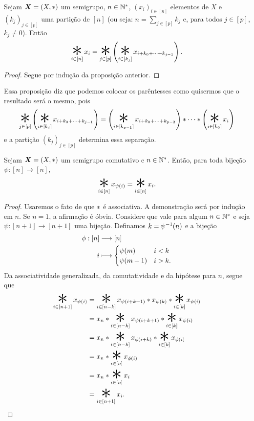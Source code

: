 \begin{prop}
Sejam $\bm X=(X,\ast)$ um semigrupo, $n \in \mathbb{N}^*$, $(x_i)_{i \in [n]}$ elementos de $X$ e $(k_j)_{j \in [p]}$ uma partição de $[n]$ (ou seja: $n = \sum_{j \in [p]} k_j$ e, para todos $j \in [p]$, $k_j \neq 0$). Então
	\begin{equation*}
	\bigopb_{i \in [n]} x_i = \bigopb_{j \in [p]}\left(\bigopb_{i \in [k_j]} x_{i + k_0 + \cdots + k_{j-1}}\right).
	\end{equation*}
\end{prop}
\begin{proof}
Segue por indução da proposição anterior.
\end{proof}

Essa proposição diz que podemos colocar os parêntesses como quisermos que o resultado será o mesmo, pois
	\begin{equation*}
	\bigopb_{j \in [p]}\left(\bigopb_{i \in [k_j]} x_{i + k_0 + \cdots + k_{j-1}}\right) = \left(\bigopb_{i \in [k_{p-1}]} x_{i + k_0 + \cdots + k_{p-2}}\right) \opb \cdots \opb \left(\bigopb_{i \in [k_0]} x_i\right)
	\end{equation*}
e a partição $(k_j)_{j \in [p]}$ determina essa separação.

\begin{prop}
Sejam $\bm X=(X, \ast )$ um semigrupo comutativo e $n \in \mathbb{N}^*$. Então, para toda bijeção $\psi\colon [n] \to [n]$,
	\begin{equation*}
	\bigopb_{i \in [n]} x_{\psi(i)} = \bigopb_{i \in [n]} x_i.
	\end{equation*}
\end{prop}
\begin{proof}
Usaremos o fato de que $\ast$ é associativa. A demonstração será por indução em $n$. Se $n=1$, a afirmação é óbvia. Considere que vale para algum $n \in \mathbb{N}^*$ e seja $\psi\colon [n+1] \to [n+1]$ uma bijeção. Definamos $k = \psi^{-1}(n)$ e a bijeção
	\begin{align*}
	{\phi}: {[n]} &\longrightarrow {[n]} \\{i} &\longmapsto {
		\begin{cases}
		\psi(m) 		& i<k \\
		\psi(m+1) & i>k.
		\end{cases}
	}
	\end{align*}
Da associatividade generalizada, da comutatividade e da hipótese para $n$, segue que
	\begin{align*}
	\bigopb_{i \in [n+1]} x_{\psi(i)}
		&= \bigopb_{i \in [n-k]} x_{\psi(i+k+1)} \opb x_{\psi(k)} \opb \bigopb_{i \in [k]} x_{\psi(i)} \\
		&= x_{n} \opb \bigopb_{i \in [n-k]} x_{\psi(i+k+1)} \opb \bigopb_{i \in [k]} x_{\psi(i)} \\
		&= x_{n} \opb \bigopb_{i \in [n-k]} x_{\phi(i+k)} \opb \bigopb_{i \in [k]} x_{\phi(i)} \\
		&= x_n \opb \bigopb_{i \in [n]} x_{\phi(i)}\\
		&= x_n \opb \bigopb_{i \in [n]} x_i \\
		&= \bigopb_{i \in [n+1]} x_i. \qedhere
	\end{align*}
\end{proof}

